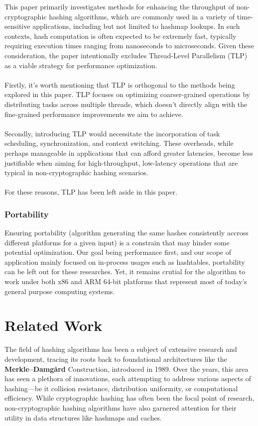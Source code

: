 \documentclass[10pt]{article}
\begin{document}
This paper primarily investigates methods for enhancing the throughput of non-cryptographic hashing algorithms, which are commonly used in a variety of time-sensitive applications, including but not limited to hashmap lookups.
In such contexts, hash computation is often expected to be extremely fast, typically requiring execution times ranging from nanoseconds to microseconds. Given these consideration, the paper intentionally excludes Thread-Level Parallelism
(TLP) as a viable strategy for performance optimization.\\\\
Firstly, it's worth mentioning that TLP is orthogonal to the methods being explored in this paper.
TLP focuses on optimizing coarser-grained operations by distributing tasks across multiple threads, which doesn't directly align with the fine-grained performance improvements we aim to achieve.\\\\
Secondly, introducing TLP would necessitate the incorporation of task scheduling, synchronization, and context switching.
These overheads, while perhaps manageable in applications that can afford greater latencies, become less justifiable when aiming for high-throughput, low-latency operations that are typical in non-cryptographic hashing scenarios.\\\\
For these reasons, TLP has been left aside in this paper.

\subsubsection{Portability}

Ensuring portability (algorithm generating the same hashes consistently accross different platforms for a given input) is a constrain that may hinder some potential optimization. Our goal being performance first, and our scope of application mainly focused on in-process usages such as hashtables, portability can be left out for these researches. Yet, it remains crutial for the algorithm to work under both x86 and ARM 64-bit platforms that represent most of today's general purpose computing systems.

\clearpage
\section{Related Work}

The field of hashing algorithms has been a subject of extensive research and development, tracing its roots back to foundational architectures like the \textbf{Merkle–Damgård} Construction\cite{merkle}\cite{damgard}, introduced in 1989. Over the years, this area has seen a plethora of innovations, each attempting to address various aspects of hashing—be it collision resistance, distribution uniformity, or computational efficiency. While cryptographic hashing has often been the focal point of research, non-cryptographic hashing algorithms have also garnered attention for their utility in data structures like hashmaps and caches.
\end{document}
